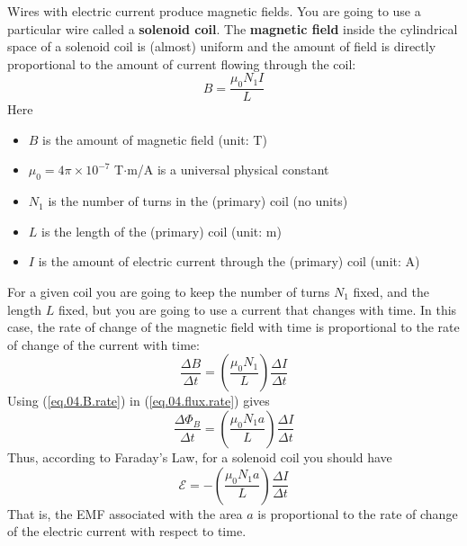 Wires with electric current produce magnetic fields. You are going to use a particular wire called a \textbf{solenoid coil}. The \textbf{magnetic field} inside the cylindrical space of a solenoid coil is (almost) uniform and the amount of field is directly proportional to the amount of current flowing through the coil:
\begin{equation}
	B = \frac{\mu_{0} N_{1} I}{L}
	\label{eq.04.B.coil}
\end{equation}
Here
\begin{itemize}
	\item $B$ is the amount of magnetic field (unit: T)
	\item $\mu_{0} = 4 \pi \times 10^{-7}$ T$\cdot$m/A  is a universal physical constant
	\item $N_{1}$ is the number of turns in the (primary) coil (no units)
	\item $L$ is the length of the (primary) coil (unit: m)
	\item $I$ is the amount of electric current through the (primary) coil (unit: A)
\end{itemize}
For a given coil you are going to keep the number of turns $N_{1}$ fixed, and the length $L$ fixed, but you are going to use a current that changes with time. In this case, the rate of change of the magnetic field with time is proportional to the rate of change of the current with time:
\begin{equation}
	\frac{\Delta B}{\Delta t} = \left( \frac{\mu_{0} N_{1}}{L} \right) \frac{\Delta I}{\Delta t}
	\label{eq.04.B.rate}
\end{equation}
Using (\ref{eq.04.B.rate}) in (\ref{eq.04.flux.rate}) gives
\begin{equation}
	\frac{\Delta \Phi_{B}}{\Delta t} = \left( \frac{\mu_{0} N_{1} a}{L} \right) \frac{\Delta I}{\Delta t}
\end{equation}
Thus, according to Faraday's Law, for a solenoid coil you should have
\begin{equation}
	\mathcal{E} = -\left( \frac{\mu_{0} N_{1} a}{L} \right) \frac{\Delta I}{\Delta t}
	\label{eq.04.emf.solenoid}
\end{equation}
That is, the EMF associated with the area $a$ is proportional to the rate of change of the electric current with respect to time.
